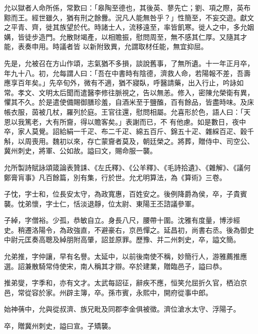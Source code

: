 \begin{pinyinscope}
 允以獄者人命所係，常歎曰：「皋陶至德也，其後英、蓼先亡；劉、項之際，英布黥而王。經世雖久，猶有刑之餘釁。況凡人能無咎乎？」性簡至，不妄交遊。獻文之平青、齊，徙其族望於代。時諸士人，流移遠至，率皆飢寒。徙人之中，多允姻媾，皆徒步造門。允散財竭產，以相贍振，慰問周至，無不感其仁厚。又隨其才能，表奏申用。時議者皆
 以新附致異，允謂取材任能，無宜抑屈。



 先是，允被召在方山作頌，志氣猶不多損，談說舊事，了無所遺。十一年正月卒，年九十八。初，允每謂人曰：「吾在中書時有陰德，濟救人命，若陽報不差，吾壽應享百年矣。」先卒旬外，微有不適，猶不寢臥，呼醫請藥，出入行止，吟詠如常。孝文、文明太后聞而遣醫李修往脈視之，告以無恙。修入，密陳允榮衛有異，懼其不久。於是遣使備賜御膳珍羞，自酒米至于鹽醢，百有餘品，皆盡時味。及床帳衣服，茵被几杖，羅列於庭。王官往還，慰問相屬。允喜形於色，語人曰：「天恩以我篤老，大有所齎，得以贍客矣。」表謝而已，不
 有他慮。如是數日，夜中卒，家人莫覺。詔給絹一千疋、布二千疋、綿五百斤、錦五十疋、雜綵百疋、穀千斛，以周喪用。魏初以來，存亡蒙齎者莫及，朝廷榮之。將葬，贈侍中、司空公、冀州刺史，將軍、公如故。謚曰文，賜命服一襲。



 允所製詩賦詠頌箴論表贊誄、《左氏釋》、《公羊釋》、《毛詩拾遺》、《雜解》、《議何鄭膏肓事》凡百餘篇，別有集，行於世。允尤明算法，為《算術》三卷。



 子忱，字士和，位長安太守，為政寬惠，百姓安之。後例降爵為侯，卒，子貴賓襲。忱弟懷，字士仁，恬淡退靜，位太尉、東陽王丕諮議參軍。



 子綽，字僧裕。少孤，恭敏自立。身長八尺，腰帶十圍。沈雅有度量，博涉經
 史。稍遷洛陽令，為政強直，不避豪右，京邑憚之。延昌初，尚書右丞。後為御史中尉元匡奏高聰及綽朋附高肇，詔並原罪。歷豫、并二州刺史，卒，謚文簡。



 允弟推，字仲讓，早有名譽。太延中，以前後南使不稱，妙簡行人，游雅薦推應選。詔兼散騎常侍使宋，南人稱其才辯。卒於建業，贈臨邑子，謚曰恭。



 推弟燮，字季和，亦有文才。太武每詔征，辭疾不應，恒笑允屈折久官，栖泊京邑，常從容於家。州辟主簿，卒。孫市賓，永熙中，開府從事中郎。



 始神蒨中，允與從叔濟、族兄毗及同郡李金俱被徵。濟位滄水太守、浮陽子。



 卒，贈冀州刺史，謚曰宣。子矯襲。




\end{pinyinscope}
